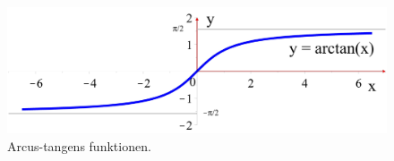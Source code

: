\begin{figure}[h]
\centerline{\includegraphics[width=120mm]{FIGS/plotArctan.pdf} }
\begin{center}
\caption{Arcus-tangens funktionen.} \label{tn14.figplotArctan}
\end{center}
\end{figure}





